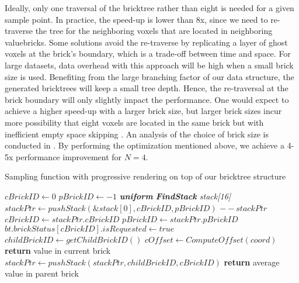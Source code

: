 Ideally, only one traversal of the bricktree rather than eight is needed for a given 
sample point. In practice, the speed-up is lower than 8x, since we need to
re-traverse the tree for the neighboring voxels that are located in neighboring
valuebricks. Some solutions avoid the re-traverse by replicating a layer of ghost voxels
at the brick's boundary, which is a trade-off between time and space. For large datasets, 
data overhead with this approach will be high when a small brick size is used. Benefiting 
from the large branching factor of our data structure, the generated bricktrees will keep
a small tree depth. Hence, the re-traversal at the brick boundary will only slightly impact the performance. 
One would expect to achieve a higher speed-up with a larger brick size, but larger
brick sizes incur more possibility that eight voxels are located in the same brick
but with inefficient empty space skipping
\cite{fogal2013analysis}. An analysis of the choice of brick size is conducted in
. 
By performing the optimization mentioned above, we achieve a 4-5x
performance improvement for $N=4$. 


\begin{algorithm}
	\caption{Sampling function with progressive rendering on top of our bricktree 
    structure}\label{alg:sample_and_stream}
	\begin{algorithmic}[1]
        	\State $cBrickID\gets \textit{0}$
            \State $pBrickID\gets \textit{$-1$}$
            \State \textit{\textbf{uniform} \textbf{FindStack} stack[16]}
            \State $stackPtr\gets pushStack(\&stack[0], cBrickID, pBrickID)$
            	\State $--stackPtr$
                	\State $cBrickID \gets stackPtr.cBrickID$
                    \State $pBrickID \gets stackPtr.pBrickID$
                    	\State $bt.brickStatus[cBrickID].isRequested \gets true$
                    \EndIf
                    \State
                		\State $childBrickID \gets getChildBrickID()$
            			\State $cOffset \gets ComputeOffset(coord)$
                			\State \textbf{return} value in current brick
               			\Else
                			\State $stackPtr\gets pushStack(stackPtr,childBrickID, cBrickID)$
                		\EndIf
                	\Else
                		\State \textbf{return} average value in parent brick
                	\EndIf
                 \EndIf
            \EndWhile
    	\EndProcedure
	\end{algorithmic}
\end{algorithm}

